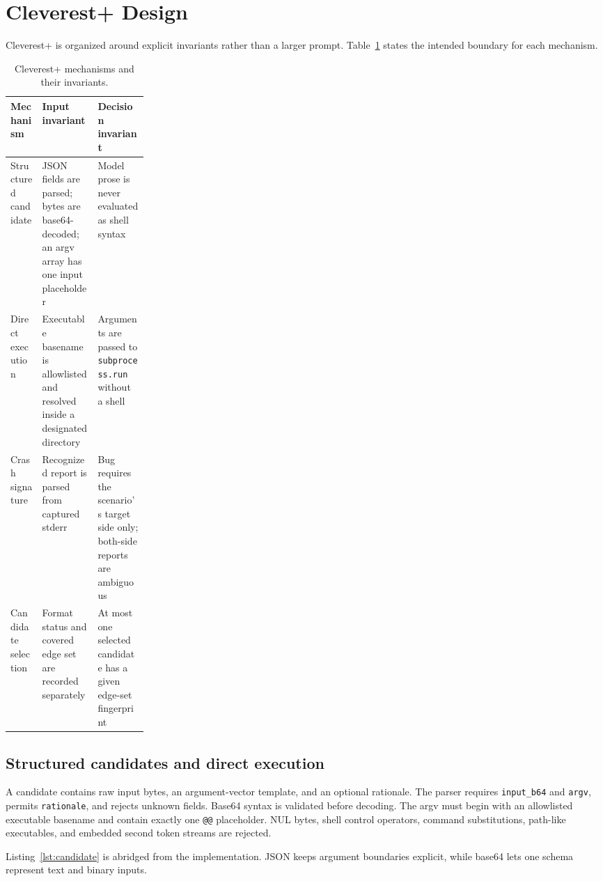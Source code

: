 \documentclass{article}
\begin{document}
\section{Cleverest+ Design}
\label{sec:design}

Cleverest+ is organized around explicit invariants rather than a larger prompt.
Table~\ref{tab:invariants} states the intended boundary for each mechanism.

\begin{table}[H]
\centering
\caption{Cleverest+ mechanisms and their invariants.}
\label{tab:invariants}
\small
\begin{tabularx}{\textwidth}{p{0.23\linewidth} X X}
\toprule
Mechanism & Input invariant & Decision invariant \\
\midrule
Structured candidate & JSON fields are parsed; bytes are base64-decoded; an argv array has one input placeholder & Model prose is never evaluated as shell syntax \\
Direct execution & Executable basename is allowlisted and resolved inside a designated directory & Arguments are passed to \texttt{subprocess.run} without a shell \\
Crash signature & Recognized report is parsed from captured stderr & Bug requires the scenario's target side only; both-side reports are ambiguous \\
Candidate selection & Format status and covered edge set are recorded separately & At most one selected candidate has a given edge-set fingerprint \\
\bottomrule
\end{tabularx}
\end{table}

\subsection{Structured candidates and direct execution}
\label{sec:design:candidate}

A candidate contains raw input bytes, an argument-vector template, and an
optional rationale.  The parser requires \texttt{input\_b64} and \texttt{argv},
permits \texttt{rationale}, and rejects unknown fields.  Base64 syntax is
validated before decoding.  The argv must begin with an allowlisted executable
basename and contain exactly one \texttt{@@} placeholder.  NUL bytes, shell
control operators, command substitutions, path-like executables, and embedded
second token streams are rejected.

Listing~\ref{lst:candidate} is abridged from the implementation.  JSON keeps
argument boundaries explicit, while base64 lets one schema represent text and
binary inputs.
\end{document}
